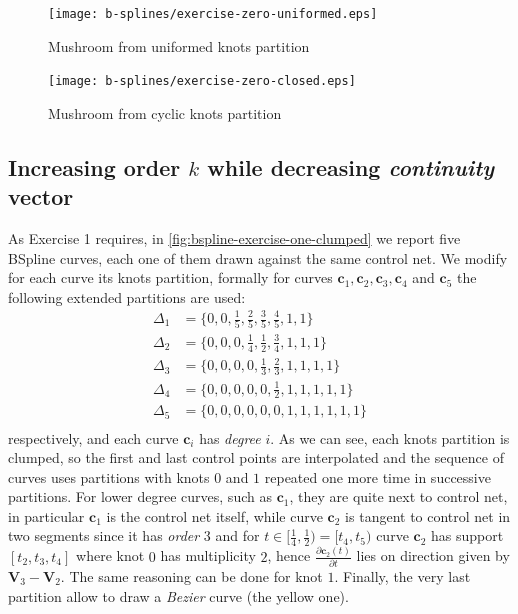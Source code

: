 \documentclass{article}
\begin{document}
\begin{figure}[h!]
  \centering
  \texttt{[image: b-splines/exercise-zero-uniformed.eps]}
  \caption{Mushroom from uniformed knots partition}
  \label{fig:uniformed-mushroom}
\end{figure}

\begin{figure}[h!]
  \centering
  \texttt{[image: b-splines/exercise-zero-closed.eps]}
  \caption{Mushroom from cyclic knots partition}
  \label{fig:closed-mushroom}
\end{figure}

\subsection{Increasing order $k$ while decreasing \emph{continuity} vector }
As Exercise 1 requires, in \autoref{fig:bspline-exercise-one-clumped} we
report five BSpline curves, each one of them drawn against the same control
net. We modify for each curve its knots partition, formally for curves
$\mathbf{c}_{1},\mathbf{c}_{2},\mathbf{c}_{3},\mathbf{c}_{4}$ and $\mathbf{c}_{5}$
the following extended partitions are used:
\begin{displaymath}
    \begin{split}
        \Delta_{1} &= \lbrace 0,0, \frac{1}{5}, \frac{2}{5},
            \frac{3}{5},\frac{4}{5},1,1 \rbrace \\
        \Delta_{2} &= \lbrace 0,0,0, \frac{1}{4},
            \frac{1}{2},\frac{3}{4},1,1,1 \rbrace \\
        \Delta_{3} &= \lbrace 0,0,0,0,
            \frac{1}{3},\frac{2}{3},1,1,1,1 \rbrace \\
        \Delta_{4} &= \lbrace 0,0,0,0,0,\frac{1}{2},
            1,1,1,1,1 \rbrace \\
        \Delta_{5} &= \lbrace 0,0,0,0,0,0,1,1,1,1,1,1 \rbrace \\
    \end{split}
\end{displaymath}
respectively, and each curve $\mathbf{c}_{i}$ has \emph{degree} $i$. As
we can see, each knots partition is clumped, so the first and last control points
are interpolated and the sequence of curves uses partitions with knots $0$ and $1$
repeated one more time in successive partitions. For lower degree curves, such as
$\mathbf{c}_{1}$, they are quite next to control net, in particular $\mathbf{c}_{1}$
is the control net itself, while curve $\mathbf{c}_{2}$ is tangent to control net
in two segments since it has \emph{order} $3$ and for $t \in [\frac{1}{4}, \frac{1}{2}) =
[t_4, t_5)$ curve $\mathbf{c}_{2}$ has support $[t_2,t_3,t_4]$ where knot $0$
has multiplicity $2$, hence $\frac{\partial \mathbf{c}_{2}(t)}{\partial t}$
lies on direction given by $\mathbf{V}_{3} - \mathbf{V}_{2}$.
The same reasoning can be done for knot $1$.
Finally, the very last partition allow to draw a \emph{Bezier} curve (the yellow one).
\end{document}
